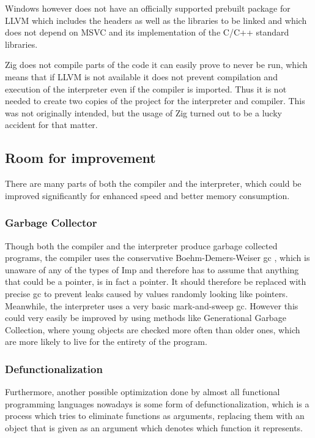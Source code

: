 \documentclass[12pt]{article}
\begin{document}
Windows however does not have
an officially supported prebuilt package for LLVM which includes the headers as well
as the libraries to be linked and which does not depend on MSVC and its
implementation of the C/C++ standard libraries.

Zig does not compile parts of the code it can easily prove to never be run,
which means that if LLVM is not available it does not prevent compilation and execution of the interpreter
even if the compiler is imported.
Thus it is not needed to create two copies of the project for the interpreter and compiler.
This was not originally intended, but the usage of Zig turned out to be a lucky accident for that matter.

\subsection{Room for improvement}
There are many parts of both the compiler and the
interpreter, which could be improved significantly
for enhanced speed and better memory consumption.

\subsubsection{Garbage Collector}
Though both the compiler and the interpreter produce
garbage collected programs, the compiler uses the
conservative Boehm-Demers-Weiser \Gls{gc} \autocite{GarbageCollector},
which is unaware of any of the types of Imp and therefore
has to assume that anything that could be a pointer,
is in fact a pointer. It should therefore be replaced with
precise \Gls{gc} to prevent leaks caused by values randomly looking
like pointers.
Meanwhile, the interpreter uses a very basic mark-and-sweep
\Gls{gc}. However this could very easily be improved
by using methods like Generational Garbage Collection, where
young objects are checked more often than older ones, which are more
likely to live for the entirety of the program.

\subsubsection{Defunctionalization}
Furthermore, another possible optimization done by almost all
functional programming languages nowadays is some form of
defunctionalization, which is a process which tries
to eliminate functions as arguments, replacing them with
an object that is given as an argument which denotes which
function it represents.
\end{document}
